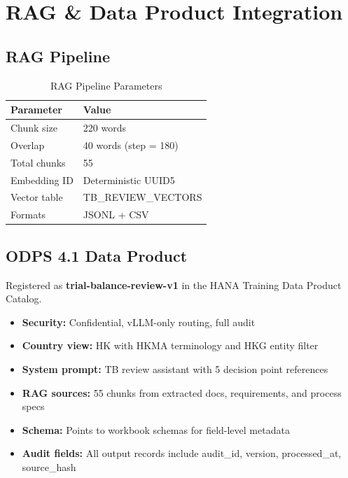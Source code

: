\documentclass[11pt,a4paper]{article}
\begin{document}
\section{RAG \& Data Product Integration}

\subsection{RAG Pipeline}

\begin{table}[h]
\centering
\caption{RAG Pipeline Parameters}
\begin{tabular}{@{}L{4cm}L{10cm}@{}}
\toprule
\textbf{Parameter} & \textbf{Value} \\
\midrule
Chunk size & 220 words \\
Overlap & 40 words (step = 180) \\
Total chunks & 55 \\
Embedding ID & Deterministic UUID5 \\
Vector table & TB\_REVIEW\_VECTORS \\
Formats & JSONL + CSV \\
\bottomrule
\end{tabular}
\end{table}

\subsection{ODPS 4.1 Data Product}

Registered as \textbf{trial-balance-review-v1} in the HANA Training Data Product Catalog.

\begin{itemize}[noitemsep]
    \item \textbf{Security:} Confidential, vLLM-only routing, full audit
    \item \textbf{Country view:} HK with HKMA terminology and HKG entity filter
    \item \textbf{System prompt:} TB review assistant with 5 decision point references
    \item \textbf{RAG sources:} 55 chunks from extracted docs, requirements, and process specs
    \item \textbf{Schema:} Points to workbook schemas for field-level metadata
    \item \textbf{Audit fields:} All output records include audit\_id, version, processed\_at, source\_hash
\end{itemize}
\end{document}
